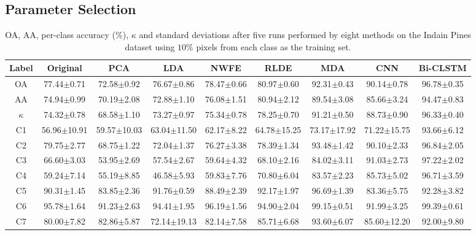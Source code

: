 \documentclass[12pt,onecolumn]{IEEEtran}
\begin{document}
\begin{spacing}{2}
\subsection{Parameter Selection}
\begin{table}\scriptsize
\centering
\caption{OA, AA, per-class accuracy ($\%$), $\kappa$ and standard deviations after five runs performed by eight methods on the Indain Pines dataset using $10\%$ pixels from each class as the training set.}
\label{IP_r}
\begin{tabular}{|c|c|c|c|c|c|c|c|c|}
\hline
Label & Original        & PCA             & LDA             & NWFE            & RLDE            & MDA             & CNN             & Bi-CLSTM       \\ \hline
OA    & 77.44$\pm$0.71  & 72.58$\pm$0.92  & 76.67$\pm$0.86  & 78.47$\pm$0.66  & 80.97$\pm$0.60  & 92.31$\pm$0.43  & 90.14$\pm$0.78  & 96.78$\pm$0.35  \\ \hline
AA    & 74.94$\pm$0.99  & 70.19$\pm$2.08  & 72.88$\pm$1.10  & 76.08$\pm$1.51  & 80.94$\pm$2.12  & 89.54$\pm$3.08  & 85.66$\pm$3.24  & 94.47$\pm$0.83  \\ \hline
$\kappa$ & 74.32$\pm$0.78& 68.58$\pm$1.10  & 73.27$\pm$0.97  & 75.34$\pm$0.78  & 78.25$\pm$0.70  & 91.21$\pm$0.50  & 88.73$\pm$0.90  & 96.33$\pm$0.40\\ \hline
C1    & 56.96$\pm$10.91 & 59.57$\pm$10.03  & 63.04$\pm$11.50 & 62.17$\pm$8.22 & 64.78$\pm$15.25  & 73.17$\pm$17.92  & 71.22$\pm$15.75 & 93.66$\pm$6.12  \\ \hline
C2    & 79.75$\pm$2.77 & 68.75$\pm$1.22 & 72.04$\pm$1.37  & 76.27$\pm$3.38 & 78.39$\pm$1.34  & 93.48$\pm$1.42     & 90.10$\pm$2.33  & 96.84$\pm$2.05 \\ \hline
C3    & 66.60$\pm$3.03 & 53.95$\pm$2.69 & 57.54$\pm$2.67 & 59.64$\pm$4.32  & 68.10$\pm$2.16 & 84.02$\pm$3.11    & 91.03$\pm$2.73  & 97.22$\pm$2.02 \\ \hline
C4    & 59.24$\pm$7.14 & 55.19$\pm$8.85 & 46.58$\pm$5.93 & 59.83$\pm$7.76  & 70.80$\pm$6.04 & 83.57$\pm$2.23     & 85.73$\pm$5.02 & 96.71$\pm$3.59  \\ \hline
C5    & 90.31$\pm$1.45  & 83.85$\pm$2.36  & 91.76$\pm$0.59  & 88.49$\pm$2.39  & 92.17$\pm$1.97  & 96.69$\pm$1.39  & 83.36$\pm$5.75  & 92.28$\pm$3.82 \\ \hline
C6    & 95.78$\pm$1.64 & 91.23$\pm$2.63 & 94.41$\pm$1.95 & 96.19$\pm$1.56 & 94.90$\pm$2.04 & 99.15$\pm$0.51      & 91.99$\pm$3.25  & 99.39$\pm$0.61 \\ \hline
C7    & 80.00$\pm$7.82  & 82.86$\pm$5.87  & 72.14$\pm$19.13 & 82.14$\pm$7.58 & 85.71$\pm$6.68 & 93.60$\pm$6.07    & 85.60$\pm$12.20 & 92.00$\pm$9.80 \\ \hline

\end{tabular}
\end{table}
\end{spacing}
\end{document}
